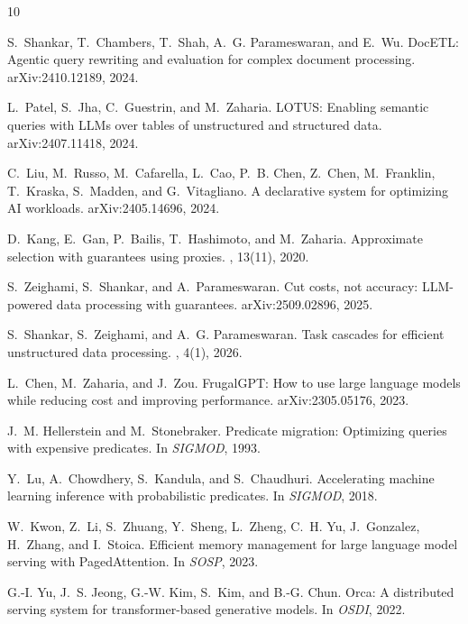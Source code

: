 \documentclass[10pt,twocolumn]{article}
\begin{document}
\begin{thebibliography}{10}
\setlength{\itemsep}{1pt}

S.~Shankar, T.~Chambers, T.~Shah, A.~G. Parameswaran, and E.~Wu.
\newblock DocETL: Agentic query rewriting and evaluation for complex document processing.
\newblock arXiv:2410.12189, 2024.

L.~Patel, S.~Jha, C.~Guestrin, and M.~Zaharia.
\newblock LOTUS: Enabling semantic queries with LLMs over tables of unstructured and structured data.
\newblock arXiv:2407.11418, 2024.

C.~Liu, M.~Russo, M.~Cafarella, L.~Cao, P.~B. Chen, Z.~Chen, M.~Franklin, T.~Kraska, S.~Madden, and G.~Vitagliano.
\newblock A declarative system for optimizing AI workloads.
\newblock arXiv:2405.14696, 2024.

D.~Kang, E.~Gan, P.~Bailis, T.~Hashimoto, and M.~Zaharia.
\newblock Approximate selection with guarantees using proxies.
, 13(11), 2020.

S.~Zeighami, S.~Shankar, and A.~Parameswaran.
\newblock Cut costs, not accuracy: LLM-powered data processing with guarantees.
\newblock arXiv:2509.02896, 2025.

S.~Shankar, S.~Zeighami, and A.~G. Parameswaran.
\newblock Task cascades for efficient unstructured data processing.
, 4(1), 2026.

L.~Chen, M.~Zaharia, and J.~Zou.
\newblock FrugalGPT: How to use large language models while reducing cost and improving performance.
\newblock arXiv:2305.05176, 2023.

J.~M. Hellerstein and M.~Stonebraker.
\newblock Predicate migration: Optimizing queries with expensive predicates.
\newblock In {\em SIGMOD}, 1993.

Y.~Lu, A.~Chowdhery, S.~Kandula, and S.~Chaudhuri.
\newblock Accelerating machine learning inference with probabilistic predicates.
\newblock In {\em SIGMOD}, 2018.

W.~Kwon, Z.~Li, S.~Zhuang, Y.~Sheng, L.~Zheng, C.~H. Yu, J.~Gonzalez, H.~Zhang, and I.~Stoica.
\newblock Efficient memory management for large language model serving with PagedAttention.
\newblock In {\em SOSP}, 2023.

G.-I. Yu, J.~S. Jeong, G.-W. Kim, S.~Kim, and B.-G. Chun.
\newblock Orca: A distributed serving system for transformer-based generative models.
\newblock In {\em OSDI}, 2022.


\end{thebibliography}
\end{document}

